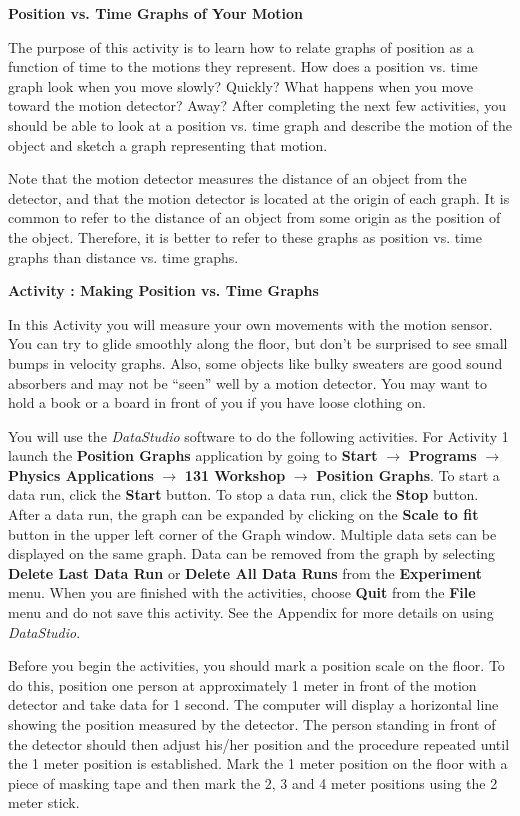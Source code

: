 \textbf{Position vs. Time Graphs of Your Motion }

The purpose of this activity is to learn how to relate graphs of position as a function
of time to the motions they represent. How does a position vs. time graph look
when you move slowly? Quickly? What happens when you move toward the motion
detector? Away? After completing the next few activities, you should be able
to look at a position vs. time graph and describe the motion of the object and sketch a graph
representing that motion.

Note that the motion detector measures the distance of an object from the detector,
and that the motion detector is located at the origin of each graph. It is common
to refer to the distance of an object from some origin as the position of the
object. Therefore, it is better to refer to these graphs as position vs. time
graphs than distance vs. time graphs.


\textbf{Activity : Making Position vs. Time Graphs }

In this Activity you will measure your own movements with the motion sensor.
You can try to glide smoothly
along the floor, but don't be surprised to see small bumps in velocity graphs.
Also, some objects like bulky sweaters are good sound absorbers and may not be
``seen'' well by a motion detector. You may want to hold a book
or a board in front of you if you have loose clothing on.

You will use the \textit{DataStudio} software to do the following activities.
For Activity 1 launch the \textbf{Position
Graphs} application by going to \textbf{Start} $\rightarrow$ \textbf{Programs} $\rightarrow$ \textbf{Physics Applications} $\rightarrow$ \textbf{131 Workshop} $\rightarrow$ \textbf{Position Graphs}. To start a data run, click the \textbf{Start} button. To stop a data run,
click the \textbf{Stop} button. After a data run, the graph can be expanded
by clicking on the \textbf{Scale to fit} button in the upper left corner of
the Graph window. Multiple data sets can be displayed on the same graph. Data
can be removed from the graph by selecting \textbf{Delete Last Data Run} or
\textbf{Delete All Data Runs} from the \textbf{Experiment} menu. When you are
finished with the activities, choose \textbf{Quit} from the \textbf{File} menu
and do not save this activity.
See the Appendix for more details on using {\it DataStudio}.

Before you begin the activities, you should mark a position scale on the floor.
To do this, position one person at approximately 1 meter in front of the motion
detector and take data for 1 second. The computer will display a horizontal
line showing the position measured by the detector. The person standing in front
of the detector should then adjust his/her position and the procedure repeated
until the 1 meter position is established. Mark the 1 meter position on the
floor with a piece of masking tape and then mark the 2, 3 and 4 meter positions
using the 2 meter stick.


